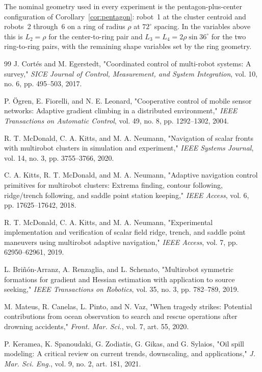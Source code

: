 \documentclass[lettersize,journal]{IEEEtran}
\begin{document}
The nominal geometry used in every experiment is the
pentagon-plus-center configuration of
Corollary~\ref{cor:pentagon}: robot~1 at the cluster centroid and
robots~2 through~6 on a ring of radius $\rho$ at $72^\circ$ spacing.
In the variables above this is $L_2 = \rho$ for the center-to-ring
pair and $L_3 = L_4 = 2\rho\sin 36^\circ$ for the two ring-to-ring
pairs, with the remaining shape variables set by the ring geometry.

\begin{thebibliography}{99}
 J. Cortés and M. Egerstedt, "Coordinated control of multi-robot
systems: A survey," \textit{SICE Journal of Control, Measurement, and
System Integration}, vol. 10, no. 6, pp. 495--503, 2017.

 P. Ögren, E. Fiorelli, and N. E. Leonard, "Cooperative control
of mobile sensor networks: Adaptive gradient climbing in a distributed
environment," \textit{IEEE Transactions on Automatic Control}, vol. 49, no. 8,
pp. 1292--1302, 2004.

 R. T. McDonald, C. A. Kitts, and M. A. Neumann, "Navigation of
scalar fronts with multirobot clusters in simulation and experiment,"
\textit{IEEE Systems Journal}, vol. 14, no. 3, pp. 3755--3766, 2020.

 C. A. Kitts, R. T. McDonald, and M. A. Neumann, "Adaptive
navigation control primitives for multirobot clusters: Extrema finding,
contour following, ridge/trench following, and saddle point station keeping,"
\textit{IEEE Access}, vol. 6, pp. 17625--17642, 2018.

 R. T. McDonald, C. A. Kitts, and M. A. Neumann, "Experimental
implementation and verification of scalar field ridge, trench, and saddle
point maneuvers using multirobot adaptive navigation," \textit{IEEE Access},
vol. 7, pp. 62950--62961, 2019.

 L. Briñón-Arranz, A. Renzaglia, and L. Schenato, "Multirobot
symmetric formations for gradient and Hessian estimation with application to
source seeking," \textit{IEEE Transactions on Robotics}, vol. 35, no. 3,
pp. 782--789, 2019.

 M. Mateus, R. Canelas, L. Pinto, and N. Vaz, "When
tragedy strikes: Potential contributions from ocean observation to
search and rescue operations after drowning accidents," \textit{Front.
Mar. Sci.}, vol. 7, art. 55, 2020.

 P. Keramea, K. Spanoudaki, G. Zodiatis, G. Gikas, and
G. Sylaios, "Oil spill modeling: A critical review on current trends,
downscaling, and applications," \textit{J. Mar. Sci. Eng.}, vol. 9,
no. 2, art. 181, 2021.


\end{thebibliography}
\end{document}
